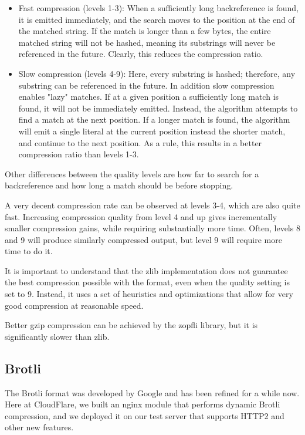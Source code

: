 \documentclass[12pt]{article}
\begin{document}
\begin{itemize}
  \item Fast compression (levels 1-3): When a sufficiently long backreference
    is found, it is emitted immediately, and the search moves to the position
    at the end of the matched string. If the match is longer than a few bytes,
    the entire matched string will not be hashed, meaning its substrings will
    never be referenced in the future. Clearly, this reduces the compression
    ratio.
  \item Slow compression (levels 4-9): Here, every substring is hashed;
    therefore, any substring can be referenced in the future. In addition slow
    compression enables "lazy" matches. If at a given position a sufficiently
    long match is found, it will not be immediately emitted. Instead, the
    algorithm attempts to find a match at the next position. If a longer match
    is found, the algorithm will emit a single literal at the current position
    instead the shorter match, and continue to the next position. As a rule,
    this results in a better compression ratio than levels 1-3.

\end{itemize}

Other differences between the quality levels are how far to search for a
backreference and how long a match should be before stopping.

A very decent compression rate can be observed at levels 3-4, which are
also quite fast. Increasing compression quality from level 4 and up
gives incrementally smaller compression gains, while requiring
substantially more time. Often, levels 8 and 9 will produce similarly
compressed output, but level 9 will require more time to do it.

It is important to understand that the zlib implementation does not
guarantee the best compression possible with the format, even when the
quality setting is set to 9. Instead, it uses a set of heuristics and
optimizations that allow for very good compression at reasonable speed.

Better gzip compression can be achieved by the zopfli library, but it is
significantly slower than zlib.

\subsection{Brotli}

The Brotli format was developed by Google and has been refined for a
while now. Here at CloudFlare, we built an nginx module that performs
dynamic Brotli compression, and we deployed it on our test server that
supports HTTP2 and other new features.
\end{document}
